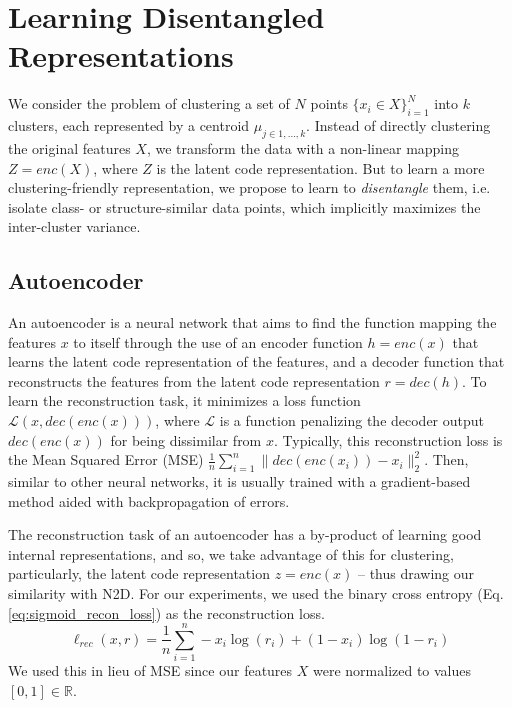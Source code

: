 \documentclass[conference]{IEEEtran}
\begin{document}
\section{Learning Disentangled Representations}\label{section:learning_disentangled_representations}
We consider the problem of clustering a set of $N$ points $\{x_{i} \in X\}_{i=1}^{N}$ into $k$ clusters, each represented by a centroid $\mu_{j\in1,\ldots,k}$. Instead of directly clustering the original features $X$, we transform the data with a non-linear mapping $Z = enc(X)$, where $Z$ is the latent code representation. But to learn a more clustering-friendly representation, we propose to learn to \textit{disentangle} them, i.e. isolate class- or structure-similar data points, which implicitly maximizes the inter-cluster variance.


\subsection{Autoencoder}
An autoencoder is a neural network that aims to find the function mapping the features $x$ to itself through the use of an encoder function $h = enc(x)$ that learns the latent code representation of the features, and a decoder function that reconstructs the features from the latent code representation $r = dec(h)$. To learn the reconstruction task, it minimizes a loss function $\mathcal{L}(x, dec(enc(x)))$, where $\mathcal{L}$ is a function penalizing the decoder output $dec(enc(x))$ for being dissimilar from $x$. Typically, this reconstruction loss is the Mean Squared Error (MSE) $\frac{1}{n} \sum_{i=1}^{n}\|dec(enc(x_{i})) - x_{i}\|_{2}^{2}$. Then, similar to other neural networks, it is usually trained with a gradient-based method aided with backpropagation of errors.

The reconstruction task of an autoencoder has a by-product of learning good internal representations, and so, we take advantage of this for clustering, particularly, the latent code representation $z = enc(x)$ -- thus drawing our similarity with N2D\cite{mcconville2019n2d}. For our experiments, we used the binary cross entropy (Eq. \ref{eq:sigmoid_recon_loss}) as the reconstruction loss.
\begin{equation}\label{eq:sigmoid_recon_loss}
    \ell_{rec}(x, r) = \dfrac{1}{n} \sum_{i=1}^{n} -x_{i}\log(r_{i}) + (1 - x_{i})\log(1 - r_{i})
\end{equation}
We used this in lieu of MSE since our features $X$ were normalized to values $[0, 1]\in\mathbb{R}$.
\end{document}

